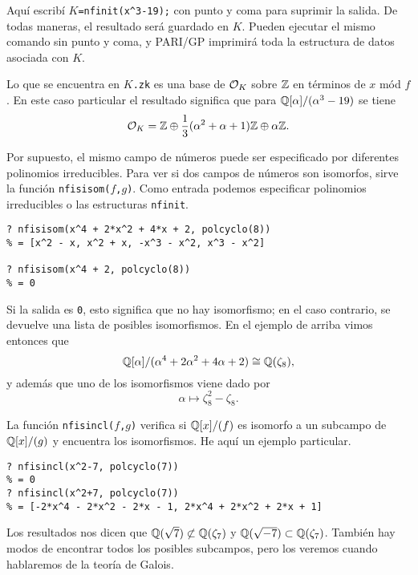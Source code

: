 Aquí escribí \texttt{$K$=nfinit(x\textasciicircum{}3-19);} con punto y coma para
suprimir la salida. De todas maneras, el resultado será guardado en $K$. Pueden
ejecutar el mismo comando sin punto y coma, y PARI/GP imprimirá toda
la estructura de datos asociada con $K$.

Lo que se encuentra en \texttt{$K$.zk} es una base de $\mathcal{O}_K$ sobre $\mathbb{Z}$ en
términos de $x$ mód $f$. En este caso particular el resultado significa que
para $\mathbb{Q} [\alpha]/(\alpha^3 - 19)$ se tiene
$$\mathcal{O}_K = \mathbb{Z} \oplus \frac{1}{3} (\alpha^2 + \alpha + 1) \mathbb{Z} \oplus \alpha \mathbb{Z}.$$

Por supuesto, el mismo campo de números puede ser especificado por diferentes
polinomios irreducibles. Para ver si dos campos de números son isomorfos, sirve
la función \texttt{nfisisom($f$,$g$)}. Como entrada podemos especificar
polinomios irreducibles o las estructuras \texttt{nfinit}.

\begin{shaded}
\begin{verbatim}
? nfisisom(x^4 + 2*x^2 + 4*x + 2, polcyclo(8))
% = [x^2 - x, x^2 + x, -x^3 - x^2, x^3 - x^2]

? nfisisom(x^4 + 2, polcyclo(8))
% = 0
\end{verbatim}
\end{shaded}

Si la salida es \texttt{0}, esto significa que no hay isomorfismo; en el caso
contrario, se devuelve una lista de posibles isomorfismos. En el ejemplo de
arriba vimos entonces que
$$\mathbb{Q} [\alpha]/(\alpha^4 + 2 \alpha^2 + 4 \alpha + 2) \cong \mathbb{Q} (\zeta_8),$$
y además que uno de los isomorfismos viene dado por
$$\alpha \mapsto \zeta_8^2 - \zeta_8.$$

La función \texttt{nfisincl($f$,$g$)} verifica si $\mathbb{Q}[x]/(f)$ es isomorfo a un
subcampo de $\mathbb{Q}[x]/(g)$ y encuentra los isomorfismos. He aquí un ejemplo
particular.

\begin{shaded}
\begin{verbatim}
? nfisincl(x^2-7, polcyclo(7))
% = 0
? nfisincl(x^2+7, polcyclo(7))
% = [-2*x^4 - 2*x^2 - 2*x - 1, 2*x^4 + 2*x^2 + 2*x + 1]
\end{verbatim}
\end{shaded}

Los resultados nos dicen que $\mathbb{Q} (\sqrt{7}) \not\subset \mathbb{Q} (\zeta_7)$
y $\mathbb{Q} (\sqrt{-7}) \subset \mathbb{Q} (\zeta_7)$. También hay modos de encontrar todos
los posibles subcampos, pero los veremos cuando hablaremos de la teoría de
Galois.


